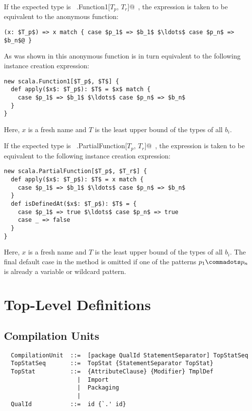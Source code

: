 If the expected type is ~\lstinline@scala.Function1[$T_p$, $T_r$]@~,
the expression is taken to be equivalent to the anonymous function:
\begin{lstlisting}
(x: $T_p$) => x match { case $p_1$ => $b_1$ $\ldots$ case $p_n$ => $b_n$@ }
\end{lstlisting}
As was shown in  this anonymous function is in turn
equivalent to the following instance creation expression:
\begin{lstlisting}
new scala.Function1[$T_p$, $T$] {
  def apply($x$: $T_p$): $T$ = $x$ match {
    case $p_1$ => $b_1$ $\ldots$ case $p_n$ => $b_n$
  }
}
\end{lstlisting}
Here, $x$ is a fresh name and $T$ is the least upper bound of the
types of all $b_i$.

If the expected type is ~\lstinline@scala.PartialFunction[$T_p$, $T_r$]@~,
the expression is taken to be equivalent to the following instance creation expression:
\begin{lstlisting}
new scala.PartialFunction[$T_p$, $T_r$] {
  def apply($x$: $T_p$): $T$ = x match {
    case $p_1$ => $b_1$ $\ldots$ case $p_n$ => $b_n$
  }
  def isDefinedAt($x$: $T_p$): $T$ = {
    case $p_1$ => true $\ldots$ case $p_n$ => true 
    case _ => false
  }
}
\end{lstlisting}
Here, $x$ is a fresh name and $T$ is the least upper bound of the
types of all $b_i$. The final default case in the 
method is omitted if one of the patterns $p_1 \commadots p_n$ is
already a variable or wildcard pattern.

\chapter{Top-Level Definitions}
\label{sec:topdefs}

\section{Compilation Units}

\syntax\begin{lstlisting}
  CompilationUnit  ::=  [package QualId StatementSeparator] TopStatSeq
  TopStatSeq       ::=  TopStat {StatementSeparator TopStat}
  TopStat          ::=  {AttributeClause} {Modifier} TmplDef
                     |  Import
                     |  Packaging
                     |
  QualId           ::=  id {`.' id}
\end{lstlisting}

